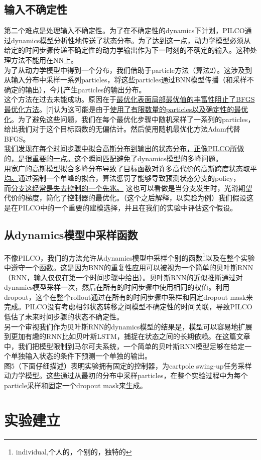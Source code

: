 \documentclass[2pt,a4paper]{article}
\begin{document}
\subsection{输入不确定性}
第二个难点是处理输入不确定性。为了在不确定性的dynamics下计划，PILCO通过dynamics模型分析性地传送了状态分布。为了达到这一点，动力学模型必须从给定的时间步骤传递不确定性的动力学输出作为下一时刻的不确定的输入。这种处理方法不能用在NN上。\\
为了从动力学模型中得到一个分布，我们借助于particle方法（算法2）。这涉及到从输入分布中采样一系列particles，将这些particles通过BNN模型传播（和采样不确定的输出），今儿产生particles的输出分布。\\
这个方法在过去未能成功。原因在于\underline{最优化表面局部最优值的丰富性阻止了BFGS最优化方法}。[7]认为这可能是由于\underline{使用了有限数量的particles以及确定性的最优化}。为了避免这些问题，我们在每个最优化步骤中随机采样了一系列的particles，给出我们对于这个目标函数的无偏估计。然后使用随机最优化方法Adam代替BFGS。\\
\underline{我们发现在每个时间步骤中拟合高斯分布到输出的状态分布，正像PILCO所做的，是很重要的一点。}这个瞬间匹配避免了dynamics模型的多峰问题。\\
\underline{用宽广的高斯模型拟合多峰分布导致了目标函数对许多高代价的高斯跨度状态取平均。}通过强制一个单峰的拟合，算法惩罚了能够导致预测状态分支的policy，\\而\underline{分支这经常是失去控制的一个先兆。} 这也可以看做是当分支发生时，光滑期望代价的梯度，简化了控制器的最优化。（这个之后解释，以实验为例）我们假设这是在PILCO中的一个重要的建模选择，并且在我们的实验中评估这个假设。
\subsection{从dynamics模型中采样函数}
不像PILCO，我们的方法允许从dynamics模型中采样个别的函数\footnote{individual,个人的，个别的，独特的}以及在整个实验中遵守一个函数。这是因为BNN的重复性应用可以被视为一个简单的贝叶斯RNN（RNN，输入仅仅在第一个时间步骤中给出）。贝叶斯RNN的近似推断通过对dynamics模型采样一次，然后在所有的时间步骤中使用相同的权值。利用dropout，这个在整个rollout通过在所有的时间步骤中采样和固定dropout mask来完成。PILCO没有考虑相邻状态转移之间模型不确定性的时间关联，导致PILCO低估了未来时间步骤的状态不确定性。\\
另一个审视我们作为贝叶斯RNN的dynamics模型的结果是，模型可以容易地扩展到更加有趣的RNN比如贝叶斯LSTM，捕捉在状态之间的长期依赖。在这篇文章中，我们把模型限制到马尔可夫系统，一个简单的贝叶斯RNN模型足够在给定一个单独输入状态的条件下预测一个单独的输出。\\
图5（下面仔细描述）表明实验拥有固定的控制器，为cartpole swing-up任务采样动力学模型。这些通过从最初的分布中采样particles，在整个实验过程中为每个particle采样和固定一个dropout mask来生成。
\section{实验建立}
\end{document}
